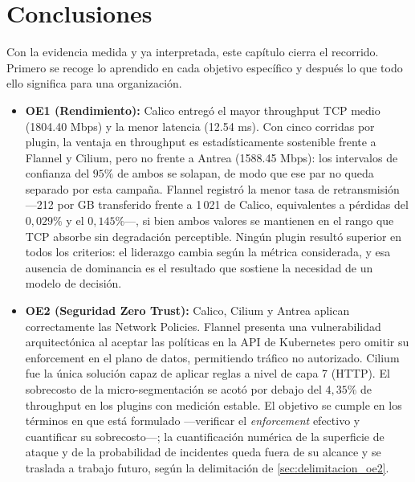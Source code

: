 \chapter{Conclusiones} \label{sec:Conclusiones}

Con la evidencia medida y ya interpretada, este capítulo cierra el recorrido. Primero se recoge lo aprendido en cada objetivo específico y después lo que todo ello significa para una organización.

\begin{itemize}
    \item \textbf{OE1 (Rendimiento):} Calico entregó el mayor throughput TCP medio (1804.40 Mbps) y la menor latencia (12.54 ms). Con cinco corridas por plugin, la ventaja en throughput es estadísticamente sostenible frente a Flannel y Cilium, pero no frente a Antrea (1588.45 Mbps): los intervalos de confianza del $95\%$ de ambos se solapan, de modo que ese par no queda separado por esta campaña. Flannel registró la menor tasa de retransmisión ---212 por GB transferido frente a 1\,021 de Calico, equivalentes a pérdidas del $0{,}029\%$ y el $0{,}145\%$---, si bien ambos valores se mantienen en el rango que TCP absorbe sin degradación perceptible. Ningún plugin resultó superior en todos los criterios: el liderazgo cambia según la métrica considerada, y esa ausencia de dominancia es el resultado que sostiene la necesidad de un modelo de decisión.
    
    \item \textbf{OE2 (Seguridad Zero Trust):} Calico, Cilium y Antrea aplican correctamente las Network Policies. Flannel presenta una vulnerabilidad arquitectónica al aceptar las políticas en la API de Kubernetes pero omitir su enforcement en el plano de datos, permitiendo tráfico no autorizado. Cilium fue la única solución capaz de aplicar reglas a nivel de capa 7 (HTTP). El sobrecosto de la micro-segmentación se acotó por debajo del $4{,}35\%$ de throughput en los plugins con medición estable. El objetivo se cumple en los términos en que está formulado ---verificar el \emph{enforcement} efectivo y cuantificar su sobrecosto---; la cuantificación numérica de la superficie de ataque y de la probabilidad de incidentes queda fuera de su alcance y se traslada a trabajo futuro, según la delimitación de \cref{sec:delimitacion_oe2}.
    

\end{itemize}
